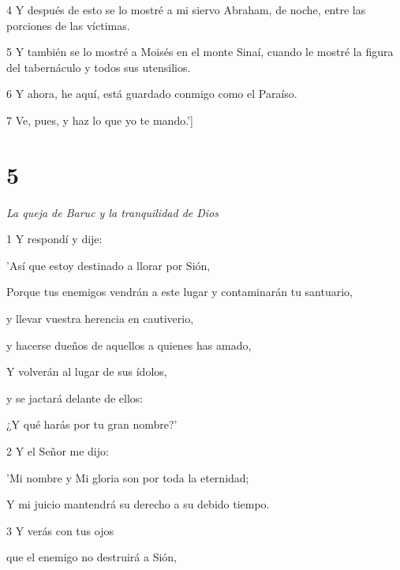 \par 4 Y después de esto se lo mostré a mi siervo Abraham, de noche, entre las porciones de las víctimas.

\par 5 Y también se lo mostré a Moisés en el monte Sinaí, cuando le mostré la figura del tabernáculo y todos sus utensilios.

\par 6 Y ahora, he aquí, está guardado conmigo como el Paraíso.

\par 7 Ve, pues, y haz lo que yo te mando.']

\chapter{5}

\par \textit{La queja de Baruc y la tranquilidad de Dios}

\par 1 Y respondí y dije:

\par 'Así que estoy destinado a llorar por Sión,

\par Porque tus enemigos vendrán a este lugar y contaminarán tu santuario,

\par y llevar vuestra herencia en cautiverio,

\par y hacerse dueños de aquellos a quienes has amado,

\par Y volverán al lugar de sus ídolos,

\par y se jactará delante de ellos:

\par ¿Y qué harás por tu gran nombre?'

\par 2 Y el Señor me dijo:

\par 'Mi nombre y Mi gloria son por toda la eternidad;

\par Y mi juicio mantendrá su derecho a su debido tiempo.

\par 3 Y verás con tus ojos

\par que el enemigo no destruirá a Sión,

